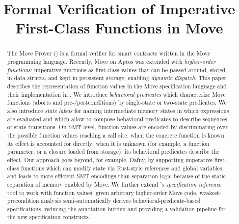 \documentclass[letterpaper,conference]{IEEEtran}
\begin{document}
\title{Formal Verification of Imperative \\First-Class Functions in Move}

\author{%
}

\maketitle


\begin{abstract}
	The Move Prover (\MVP) is a formal verifier for smart contracts written in the Move programming language.
	Recently, Move on Aptos was extended with \emph{higher-order functions}: imperative functions as first-class values that can be passed around, stored in data structs, and kept in persistent storage, enabling \emph{dynamic dispatch}.
	This paper describes the representation of function values in the Move specification language and their implementation in \MVP.
	We introduce \emph{behavioral predicates} which characterize Move functions (aborts and pre-/postconditions) by single-state or two-state predicates.
	We also introduce \emph{state labels} for naming intermediate memory states in which expressions are evaluated and which allow to compose behavioral predicates to describe sequences of state transitions.
	On SMT level, function values are encoded by discriminating over the possible function values reaching a call site: when the concrete function is known, its effect is accounted for directly; when it is unknown (for example, a function parameter, or a closure loaded from storage), its behavioral predicates describe the effect.
    Our approach goes beyond, for example, Dafny, by supporting imperative first-class functions which can modify state via Rust-style references and global variables, and leads to more efficient SMT encodings than separation logic because of the static separation of memory enabled by Move.
	We further extend \MVP's \emph{specification inference} tool to work with function values: given arbitrary higher-order Move code, weakest-precondition analysis semi-automatically derives behavioral-predicate-based specifications, reducing the annotation burden and providing a validation pipeline for the new specification constructs.
\end{abstract}







\newpage



%
\end{document}
